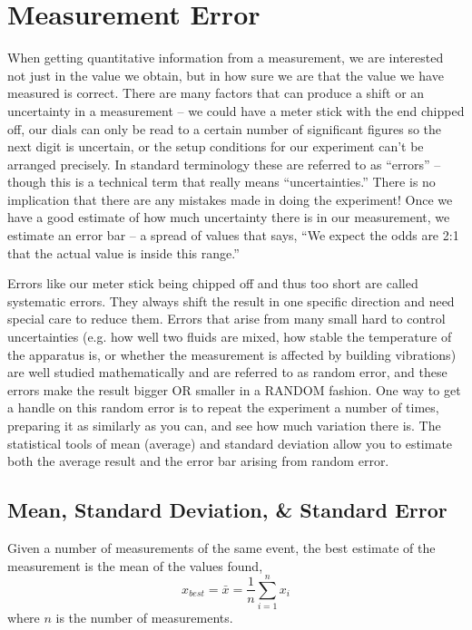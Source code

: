 \chapter{Measurement Error}
\thispagestyle{fancy}
%
When getting quantitative information from a measurement, we are interested not just in the value
we obtain, but in how sure we are that the value we have measured is correct.
There are many factors that can produce a shift or an uncertainty in a measurement – we could have a meter stick with the end chipped off, our dials can only be read to a certain number of significant figures so the next digit is uncertain, or the setup conditions for our experiment can't be arranged precisely. 
In standard terminology these are referred to as ``errors'' – though this is a technical term that really means ``uncertainties.'' 
There is no implication that there are any mistakes made in doing the experiment!
Once we have a good estimate of how much uncertainty there is in our measurement, we estimate an error bar – a spread of values that says, ``We expect the odds are 2:1 that the actual value is inside this range.''
\par
Errors like our meter stick being chipped off and thus too short are called systematic errors. 
They always shift the result in one specific direction and need special care to reduce them.
Errors that arise from many small hard to control uncertainties (e.g. how well two fluids are mixed, how stable the temperature of the apparatus is, or whether the measurement is affected by building vibrations) are well studied mathematically and are referred to as random error, and these errors make the result bigger OR smaller in a RANDOM fashion. 
One way to get a handle on this random error is to repeat the experiment a number of times, preparing it as similarly as you can, and see how much variation there is. 
The statistical tools of mean (average) and standard deviation allow you to estimate both the average result and the error bar arising from random error.

\section*{Mean, Standard Deviation, \& Standard Error}
Given a number of measurements of the same event, the best estimate of the measurement is the mean of the values found,
\[ x_{best} = \bar{x} = \frac{1}{n} \sum_{i=1}^{n} x_{i} \]
where $n$ is the number of measurements.

